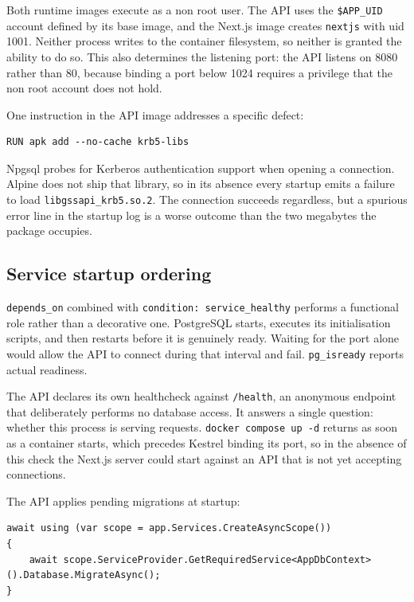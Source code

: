 \documentclass[11pt,a4paper]{article}
\newcommand{\code}[1]{\texttt{\fontsize{8.6}{10}\selectfont #1}}
\begin{document}
Both runtime images execute as a non root user. The API uses the
\code{\$APP\_UID} account defined by its base image, and the Next.js image
creates \code{nextjs} with uid 1001. Neither process writes to the container
filesystem, so neither is granted the ability to do so. This also determines the
listening port: the API listens on 8080 rather than 80, because binding a port
below 1024 requires a privilege that the non root account does not hold.

One instruction in the API image addresses a specific defect:

\begin{lstlisting}
RUN apk add --no-cache krb5-libs
\end{lstlisting}

Npgsql probes for Kerberos authentication support when opening a connection.
Alpine does not ship that library, so in its absence every startup emits a
failure to load \code{libgssapi\_krb5.so.2}. The connection succeeds
regardless, but a spurious error line in the startup log is a worse outcome
than the two megabytes the package occupies.

\subsection{Service startup ordering}

\code{depends\_on} combined with \code{condition: service\_healthy} performs a
functional role rather than a decorative one. PostgreSQL starts, executes its
initialisation scripts, and then restarts before it is genuinely ready. Waiting
for the port alone would allow the API to connect during that interval and
fail. \code{pg\_isready} reports actual readiness.

The API declares its own healthcheck against \code{/health}, an anonymous
endpoint that deliberately performs no database access. It answers a single
question: whether this process is serving requests.
\code{docker compose up -d} returns as soon as a container starts, which
precedes Kestrel binding its port, so in the absence of this check the Next.js
server could start against an API that is not yet accepting connections.

The API applies pending migrations at startup:

\begin{lstlisting}
await using (var scope = app.Services.CreateAsyncScope())
{
    await scope.ServiceProvider.GetRequiredService<AppDbContext>().Database.MigrateAsync();
}
\end{lstlisting}
\end{document}
